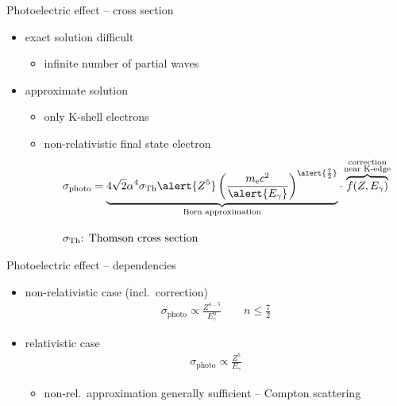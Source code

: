 \documentclass[11pt,xcolor=dvipsnames,professionalfonts,notes]{beamer}
\begin{document}
\begin{frame}{Photoelectric effect -- cross section}
	\begin{itemize}
		\setlength\itemsep{1.5em}
		\item exact solution difficult
		\begin{itemize}
			\item infinite number of partial waves
		\end{itemize}
		\item approximate solution
		\begin{itemize}
			\item only K-shell electrons
			\item non-relativistic final state electron			
			\begin{align*}
				&\sigma_\mathrm{photo} = \underbrace{4\sqrt{2} \alpha^4 \sigma_\mathrm{Th} \alert{Z^5}  \left( \frac{m_\mathrm{e}c^2}{\alert{E_\gamma}} \right)^{\alert{\frac{7}{2}}}}_{\text{Born approximation}} \cdot \, \overbrace{f(Z, E_\gamma)}^{\mathclap{\substack{\text{correction}\\\text{near K-edge}}}} \\[1em]
				&\sigma_\mathrm{Th}\text{: Thomson cross section}
			\end{align*}
		\end{itemize}
	\end{itemize}
\end{frame}


\begin{frame}{Photoelectric effect -- dependencies}
	\begin{itemize}
		\setlength\itemsep{1.5em}
		\item non-relativistic case (incl.\ correction)
		\begin{align*}
		\sigma_\mathrm{photo} \propto  \frac{Z^{4 \, \dots \, 5}}{E_\gamma^{n}} \qquad n \leq \frac{7}{2}
		\end{align*}
		
		\item relativistic case
		\begin{align*}
			\sigma_\mathrm{photo} \propto \frac{Z^5}{E_\gamma}
		\end{align*}
		\begin{itemize}
			\item non-rel.\ approximation generally sufficient -- Compton scattering
		\end{itemize} 
	\end{itemize}
\end{frame}
\end{document}
